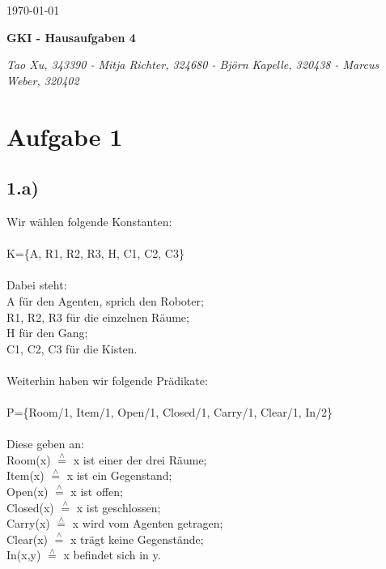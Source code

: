 \documentclass[a4paper]{article}
\newcommand{\entspricht}{\stackrel{\scriptscriptstyle\wedge}{=}}
\begin{document}
  \begin{flushright}
    \today
  \end{flushright}
  \begin{center}
    \Large\textbf{{GKI - Hausaufgaben 4}}\\
  \end{center}

  \begin{center}
        \large\textsl{Tao Xu, 343390 - Mitja Richter, 324680 - Björn Kapelle, 320438 - Marcus Weber, 320402}\\
  \end{center}
\section*{Aufgabe 1}
\subsection*{1.a)}
Wir w\"ahlen folgende Konstanten:\\
\\
K=\{A, R1, R2, R3, H, C1, C2, C3\}\\
\\
Dabei steht:\\
A f\"ur den Agenten, sprich den Roboter;\\
R1, R2, R3 f\"ur die einzelnen R\"aume;\\
H f\"ur den Gang;\\
C1, C2, C3 f\"ur die Kisten.\\
\\
Weiterhin haben wir folgende Pr\"adikate:\\
\\
P=\{Room/1, Item/1, Open/1, Closed/1, Carry/1, Clear/1, In/2\}\\
\\
Diese geben an:\\
Room(x) $\entspricht$ x ist einer der drei R\"aume;\\
Item(x) $\entspricht$ x ist ein Gegenstand;\\
Open(x) $\entspricht$ x ist offen;\\
Closed(x) $\entspricht$ x ist geschlossen;\\
Carry(x) $\entspricht$ x wird vom Agenten getragen;\\
Clear(x) $\entspricht$ x tr\"agt keine Gegenst\"ande;\\
In(x,y) $\entspricht$ x befindet sich in y.\\
\\
\end{document}
